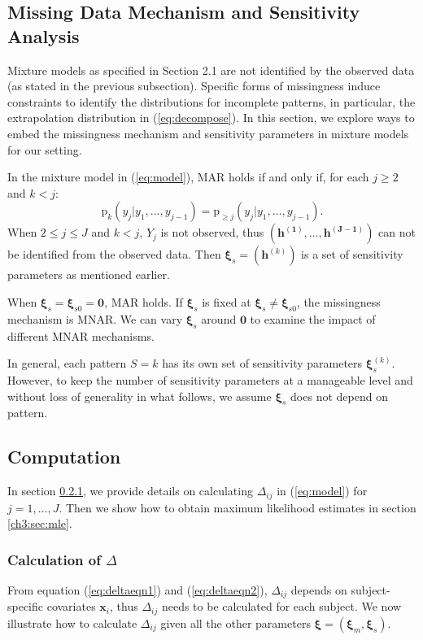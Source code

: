 \documentclass[useAMS,usenatbib,referee]{biom}
\newcommand{\pr}{\mbox{p}}
\begin{document}
\subsection{Missing Data Mechanism and Sensitivity Analysis}
\label{ch3:sec:sa}

Mixture models as specified in Section 2.1 are not identified
by the observed data (as stated in the previous subsection). Specific forms of missingness
induce constraints to identify the distributions for
incomplete patterns, in particular, the extrapolation distribution in
(\ref{eq:decompose}). In this section, we explore ways to embed the
missingness mechanism and sensitivity parameters in mixture models for
our setting.

In the mixture model in (\ref{eq:model}), MAR holds \citep{molen1998,
  wang2011} if and only if, for each $j \geq 2$ and $k < j$:
\begin{displaymath}
  \pr_k(y_j|y_1, \ldots, y_{j-1}) = \pr_{\geq j}(y_j|y_1, \ldots, y_{j-1}).
\end{displaymath}
When $2 \leq j \leq J$ and $k < j$, $Y_j$ is not observed, thus
$(\bm{h^{(1)},\ldots,h^{(J-1)}})$ can not be identified from the
observed data.
Then $\bm \xi_s = (\bm h^{(k)})$ is a set
of sensitivity parameters \citep{dh2008} as mentioned earlier.

When $\bm \xi_s = \bm \xi_{s0} = \bm 0$, MAR holds. If
$\bm \xi_s$ is fixed at $\bm \xi_s \neq \bm \xi_{s0}$, the
missingness mechanism is MNAR. We can vary $\bm \xi_s$ around
$\bm 0$ to examine the impact of different MNAR mechanisms.

In general, each pattern $S = k$ has its own set of sensitivity
parameters $\bm \xi_s^{(k)}$. However, to keep the number of
sensitivity parameters at a manageable level \citep{dh2008} and
without loss of generality in what follows, we assume $\bm \xi_s$ does not depend
on pattern.

\subsection{Computation}
\label{ch3:sec:computation}

In section \ref{ch3:sec:deltacal}, we provide details on calculating
$\Delta_{ij}$ in (\ref{eq:model}) for $j = 1, \ldots, J$. Then we show
how to obtain maximum likelihood estimates in section
\ref{ch3:sec:mle}.

\subsubsection{Calculation of $\Delta$ }
\label{ch3:sec:deltacal}
From equation (\ref{eq:deltaeqn1}) and (\ref{eq:deltaeqn2}),
$\Delta_{ij}$ depends on subject-specific covariates $\bm x_{i}$,
thus $\Delta_{ij}$ needs to be calculated for each subject. We now
illustrate how to calculate $\Delta_{ij}$ given all the other
parameters $\bm \xi = (\bm \xi_m, \bm \xi_s)$.
\end{document}
